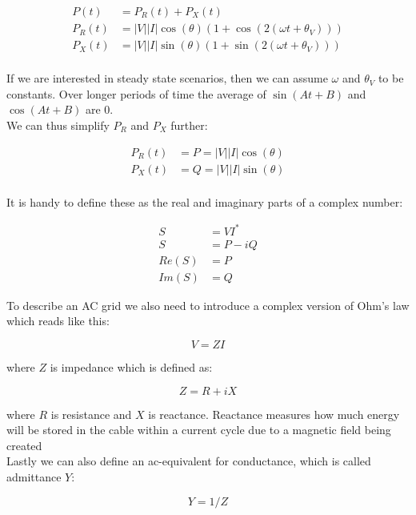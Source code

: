 \begin{equation}
    \begin{aligned}
        P(t)   &= P_R(t) + P_X(t)\\
        P_R(t) &= |V||I| \cos(\theta) (1 + \cos(2(\omega t+\theta_V)))\\
        P_X(t) &= |V||I| \sin(\theta) (1 + \sin(2(\omega t+\theta_V)))\\
    \end{aligned}
    \label{eq:ac:power_react_and_capacitive}
\end{equation}

If we are interested in steady state scenarios, then we can assume $\omega$ and $\theta_V$ 
to be constants. Over longer periods of time the average of $\sin(A t + B)$ and $\cos(A t + B)$ are 0.\\
We can thus simplify $P_R$ and $P_X$ further:

\begin{equation}
    \begin{aligned}
        P_R(t) &= P = |V||I| \cos(\theta)\\
        P_X(t) &= Q = |V||I| \sin(\theta)\\
    \end{aligned}
    \label{eq:ac:power_react_and_imag}
\end{equation}

It is handy to define these as the real and imaginary parts of a complex number:

\begin{equation}
    \begin{aligned}
        S     &=  V I^*\\
        S     &= P - iQ\\
        Re(S) &= P\\ 
        Im(S) &= Q
    \end{aligned}
    \label{eq:ac:complex}
\end{equation}

To describe an AC grid we also need to introduce a complex version
of Ohm's law which reads like this:

\begin{equation}
    V = ZI
    \label{eq:ac:ohm_complex}
\end{equation}

where $Z$ is impedance which is defined as:

\begin{equation}
    Z = R + iX
    \label{eq:ac:impedance}
\end{equation}

where $R$ is resistance and $X$ is reactance. Reactance measures how much
energy will be stored in the cable within a current cycle due to a magnetic
field being created\\

Lastly we can also define an ac-equivalent for conductance, which is called admittance $Y$:

\begin{equation}
    Y = 1/Z
    \label{eq:ac:admittance}
\end{equation}